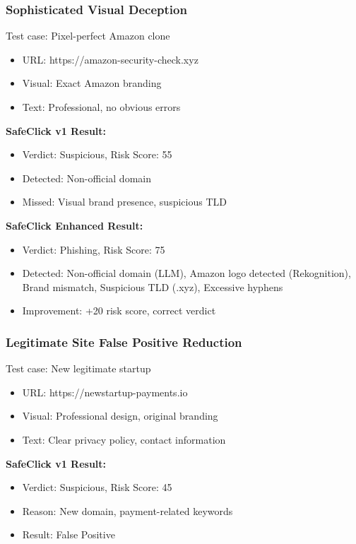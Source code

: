 \documentclass[conference]{IEEEtran}
\begin{document}
\subsubsection{Sophisticated Visual Deception}

Test case: Pixel-perfect Amazon clone
\begin{itemize}
\item URL: https://amazon-security-check.xyz
\item Visual: Exact Amazon branding
\item Text: Professional, no obvious errors
\end{itemize}

\textbf{SafeClick v1 Result:}
\begin{itemize}
\item Verdict: Suspicious, Risk Score: 55
\item Detected: Non-official domain
\item Missed: Visual brand presence, suspicious TLD
\end{itemize}

\textbf{SafeClick Enhanced Result:}
\begin{itemize}
\item Verdict: Phishing, Risk Score: 75
\item Detected: Non-official domain (LLM), Amazon logo detected (Rekognition), Brand mismatch, Suspicious TLD (.xyz), Excessive hyphens
\item Improvement: +20 risk score, correct verdict
\end{itemize}

\subsubsection{Legitimate Site False Positive Reduction}

Test case: New legitimate startup
\begin{itemize}
\item URL: https://newstartup-payments.io
\item Visual: Professional design, original branding
\item Text: Clear privacy policy, contact information
\end{itemize}

\textbf{SafeClick v1 Result:}
\begin{itemize}
\item Verdict: Suspicious, Risk Score: 45
\item Reason: New domain, payment-related keywords
\item Result: False Positive
\end{itemize}
\end{document}
